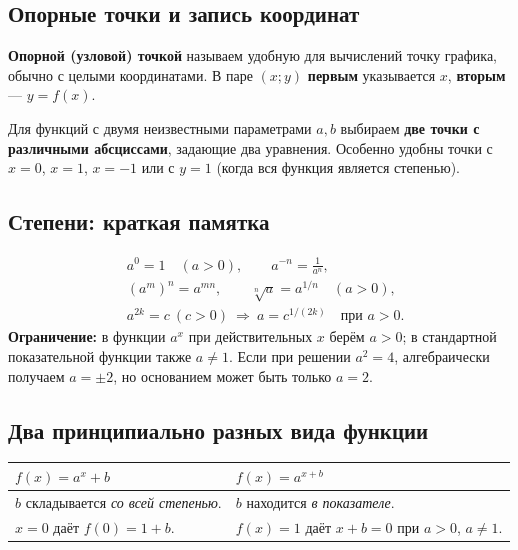 \documentclass[a4paper,12pt]{article}
\newcommand{\strong}[1]{\textcolor{darkaccent}{\textbf{#1}}}
\begin{document}
\subsection*{Опорные точки и запись координат}
\strong{Опорной (узловой) точкой} называем удобную для вычислений точку графика, обычно с целыми координатами. В паре \((x;y)\) \textbf{первым} указывается $x$, \textbf{вторым} --- $y=f(x)$.

Для функций с двумя неизвестными параметрами $a,b$ выбираем \strong{две точки с различными абсциссами}, задающие два уравнения. Особенно удобны точки с $x=0$, $x=1$, $x=-1$ или с $y=1$ (когда вся функция является степенью).

\subsection*{Степени: краткая памятка}
\begin{align*}
&a^0=1\quad(a>0),\qquad a^{-n}=\frac{1}{a^n},\\
&(a^m)^n=a^{mn},\qquad \sqrt[n]{a}=a^{1/n}\quad(a>0),\\
&a^{2k}=c\ (c>0)\ \Longrightarrow\ a=c^{1/(2k)}\quad\text{при }a>0.
\end{align*}
\textbf{Ограничение:} в функции $a^x$ при действительных $x$ берём $a>0$; в стандартной показательной функции также $a\ne1$. Если при решении $a^2=4$, алгебраически получаем $a=\pm2$, но основанием может быть только $a=2$.

\subsection*{Два принципиально разных вида функции}
\begin{center}
\begin{tabularx}{\linewidth}{@{}X X@{}}
\toprule
\(f(x)=a^x+b\) & \(f(x)=a^{x+b}\)\\
\midrule
$b$ складывается \emph{со всей степенью}. & $b$ находится \emph{в показателе}.\\
$x=0$ даёт $f(0)=1+b$. & $f(x)=1$ даёт $x+b=0$ при $a>0$, $a\ne1$.\\
\bottomrule
\end{tabularx}
\end{center}

\clearpage
\end{document}
